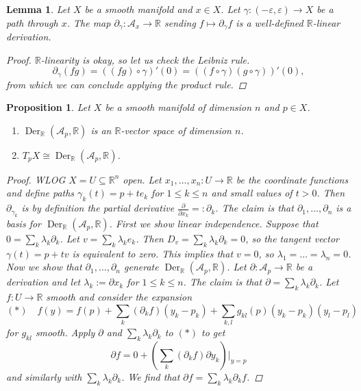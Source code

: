 \documentclass[12pt]{article}
\theoremstyle{darkgreentheorem}
\newtheorem{lm}[thm]{Lemma}
\newtheorem{prop}[thm]{Proposition}
\theoremstyle{darkbluedefinition}
\theoremstyle{darkredexample}
\theoremstyle{remark}
\newcommand{\R}{\mathbb{R}}
\newcommand{\1}{\mathbbm{1}}
\newcommand{\calA}{\mathcal{A}}
\DeclareMathOperator{\Der}{Der}
\newcommand{\sub}{\subseteq}
\begin{document}
\begin{lm}
    Let $X$ be a smooth manifold and $x\in X$.
    Let $\gamma\colon (-\varepsilon, \varepsilon)\to X$ be a path through $x$.
    The map $\partial_{\gamma}\colon \calA_{x}\to \R$ sending $f\mapsto \partial_{\gamma}f$ is a well-defined $\R$-linear derivation.
    \begin{proof}
	$\R$-linearity is okay, so let us check the Leibniz rule.
	\[ \partial_{\gamma}(fg)=((fg)\circ \gamma)'(0)=((f\circ \gamma)(g\circ \gamma))'(0),\]
	from which we can conclude applying the product rule.
    \end{proof}
\end{lm}

\begin{prop}
    Let $X$ be a smooth manifold of dimension $n$ and $p\in X$.
    \begin{enumerate}
	\item $\Der_{\R}(\calA_{p},\R)$ is an $\R$-vector space of dimension $n$.
	\item $T_{p}X\cong \Der_{\R}(\calA_{p},\R)$.
    \end{enumerate}
    \begin{proof}
	WLOG $X=U\sub \R^{n}$ open.
	Let $x_{1},\ldots,x_{n}\colon U\to \R$ be the coordinate functions and define paths $\gamma_{k}(t)=p+te_{k}$ for $1\leqslant k\leqslant n$ and small values of $t>0$.
	Then $\partial_{\gamma_{k}}$ is by definition the partial derivative $\frac{\partial}{\partial x_{k}}=:\partial_{k}$.
	The claim is that $\partial_{1},\ldots,\partial_{n}$ is a basis for $\Der_{\R}(\calA_{p},\R)$.
	First we show linear independence.
	Suppose that $0=\sum_{k}\lambda_{k}\partial_{k}$.
	Let $v=\sum_{k}\lambda_{k}e_{k}$.
	Then $D_{v}=\sum_{k}\lambda_{k}\partial_{k}=0$, so the tangent vector $\gamma(t)=p+tv$ is equivalent to zero.
	This implies that $v=0$, so $\lambda_{1}=\ldots=\lambda_{n}=0$.
	Now we show that $\partial_{1},\ldots,\partial_{n}$ generate $\Der_{\R}(\calA_{p},\R)$.
	Let $\partial\colon \calA_{p}\to \R$ be a derivation and let $\lambda_{k}:=\partial x_{k}$ for $1\leqslant k\leqslant n$.
	The claim is that $\partial =\sum_{k}\lambda_{k}\partial_{k}$.
	Let $f\colon U\to \R$ smooth and consider the expansion
	\[ (*)\quad f(y)=f(p)+\sum_{k}(\partial_{k}f)(y_{k}-p_{k})+\sum_{k,l}g_{kl}(p)(y_{k}-p_{k})(y_{l}-p_{l}) \]
	for $g_{kl}$ smooth.
	Apply $\partial $ and $\sum_{k}\lambda_{k}\partial_{k}$ to $(*)$ to get
	\[ \partial f=0+(\sum_{k}(\partial_{k} f)\partial y_{k})|_{y=p} \]
	and similarly with $\sum_{k}\lambda_{k}\partial_{k}$.
	We find that $\partial f=\sum_{k}\lambda_{k}\partial_{k} f$.
    \end{proof}
\end{prop}
\end{document}
